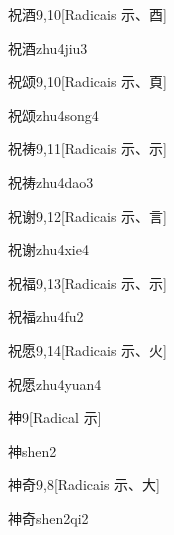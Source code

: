 \begin{entry}{祝酒}{9,10}[Radicais ⽰、⾣]
  \begin{phonetics}{祝酒}{zhu4jiu3}
  \end{phonetics}
\end{entry}

\begin{entry}{祝颂}{9,10}[Radicais ⽰、⾴]
  \begin{phonetics}{祝颂}{zhu4song4}
  \end{phonetics}
\end{entry}

\begin{entry}{祝祷}{9,11}[Radicais ⽰、⽰]
  \begin{phonetics}{祝祷}{zhu4dao3}
  \end{phonetics}
\end{entry}

\begin{entry}{祝谢}{9,12}[Radicais ⽰、⾔]
  \begin{phonetics}{祝谢}{zhu4xie4}
  \end{phonetics}
\end{entry}

\begin{entry}{祝福}{9,13}[Radicais ⽰、⽰]
  \begin{phonetics}{祝福}{zhu4fu2}
  \end{phonetics}
\end{entry}

\begin{entry}{祝愿}{9,14}[Radicais ⽰、⽕]
  \begin{phonetics}{祝愿}{zhu4yuan4}
  \end{phonetics}
\end{entry}

\begin{entry}{神}{9}[Radical ⽰]
  \begin{phonetics}{神}{shen2}
  \end{phonetics}
\end{entry}

\begin{entry}{神奇}{9,8}[Radicais ⽰、⼤]
  \begin{phonetics}{神奇}{shen2qi2}
  \end{phonetics}
\end{entry}


